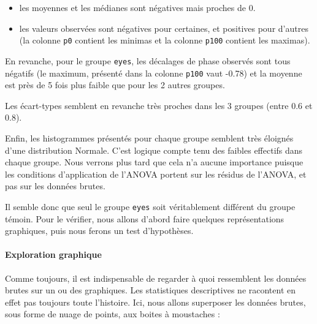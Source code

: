 \documentclass[
  a4paper,
]{article}
\newenvironment{Shaded}{\begin{snugshade}}{\end{snugshade}}
\newcommand{\DataTypeTok}[1]{\textcolor[rgb]{0.00,0.34,0.68}{#1}}
\newcommand{\FloatTok}[1]{\textcolor[rgb]{0.69,0.50,0.00}{#1}}
\newcommand{\KeywordTok}[1]{\textcolor[rgb]{0.12,0.11,0.11}{\textbf{#1}}}
\newcommand{\NormalTok}[1]{\textcolor[rgb]{0.12,0.11,0.11}{#1}}
\newcommand{\OperatorTok}[1]{\textcolor[rgb]{0.12,0.11,0.11}{#1}}
\newcommand{\OtherTok}[1]{\textcolor[rgb]{0.00,0.43,0.16}{#1}}
\newcommand{\StringTok}[1]{\textcolor[rgb]{0.75,0.01,0.01}{#1}}
\providecommand{\tightlist}{%
  \setlength{\itemsep}{0pt}\setlength{\parskip}{0pt}}
\begin{document}
\begin{itemize}
\tightlist
\item
  les moyennes et les médianes sont négatives mais proches de 0.
\item
  les valeurs observées sont négatives pour certaines, et positives pour d'autres (la colonne \texttt{p0} contient les minimas et la colonne \texttt{p100} contient les maximas).
\end{itemize}

En revanche, pour le groupe \texttt{eyes}, les décalages de phase observés sont tous négatifs (le maximum, présenté dans la colonne \texttt{p100} vaut -0.78) et la moyenne est près de 5 fois plus faible que pour les 2 autres groupes.

Les écart-types semblent en revanche très proches dans les 3 groupes (entre 0.6 et 0.8).

Enfin, les histogrammes présentés pour chaque groupe semblent très éloignés d'une distribution Normale. C'est logique compte tenu des faibles effectifs dans chaque groupe. Nous verrons plus tard que cela n'a aucune importance puisque les conditions d'application de l'ANOVA portent sur les résidus de l'ANOVA, et pas sur les données brutes.

Il semble donc que seul le groupe \texttt{eyes} soit véritablement différent du groupe témoin. Pour le vérifier, nous allons d'abord faire quelques représentations graphiques, puis nous ferons un test d'hypothèses.

\hypertarget{exploration-graphique-3}{%
\paragraph{Exploration graphique}\label{exploration-graphique-3}}

Comme toujours, il est indispensable de regarder à quoi ressemblent les données brutes sur un ou des graphiques. Les statistiques descriptives ne racontent en effet pas toujours toute l'histoire. Ici, nous allons superposer les données brutes, sous forme de nuage de points, aux boites à moustaches :

\begin{Shaded}
\end{Shaded}
\end{document}
